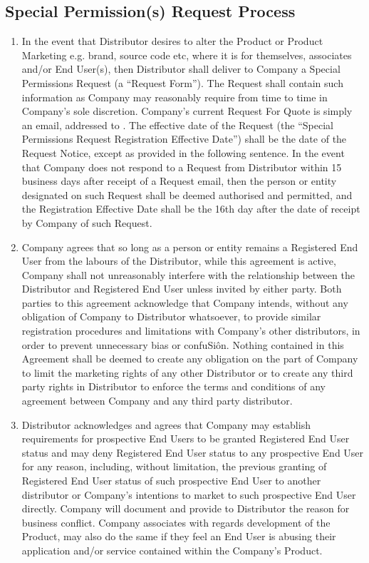 \documentclass[letterpaper,10pt,openany,oneside,english]{sphinxmanual}
\begin{document}
\subsection{Special Permission(s) Request Process}
\label{\detokenize{grantlicence:special-permission-s-request-process}}\begin{enumerate}
\item {} 
In the event that Distributor desires to alter the Product or Product Marketing e.g. brand, source code etc, where it is for themselves, associates and/or End User(s), then Distributor shall deliver to Company a Special Permissions Request (a “Request Form”). The Request shall contain such information as Company may reasonably require from time to time in Company’s sole discretion. Company’s current Request For Quote is simply an email, addressed to  .  The effective date of the Request  (the “Special Permissions Request Registration Effective Date”) shall be the date of the Request Notice, except as provided in the following sentence. In the event that Company does not respond to a Request from Distributor within 15 business days after receipt of a Request email, then the person or entity designated on such Request shall be deemed authorised and permitted, and the Registration Effective Date  shall be the 16th day after the date of receipt by Company of such Request.

\item {} 
Company agrees that so long as a person or entity remains a Registered End User from the  labours of the Distributor, while this agreement is active, Company shall not unreasonably interfere with the relationship between the Distributor and Registered End User unless invited by either party. Both parties to this agreement acknowledge that Company intends, without any obligation of Company to Distributor whatsoever, to provide similar registration procedures and limitations with Company’s other distributors, in order to prevent unnecessary bias or confuSiôn. Nothing contained in this Agreement shall be deemed to create any obligation on the part of Company to limit the marketing rights of any other Distributor or to create any third party rights in Distributor to enforce the terms and conditions of any agreement between Company and any third party distributor.

\item {} 
Distributor acknowledges and agrees that Company may establish requirements for prospective End Users to be granted Registered End User status and may deny Registered End User status to any prospective End User for any reason, including, without limitation, the previous granting of Registered End User status of such prospective End User to another distributor or Company’s intentions to market to such prospective End User directly. Company will document and provide to Distributor the reason for business conflict. Company associates with regards development of the Product, may also do the same if they feel an End User is abusing their application and/or service contained within the Company’s Product.

\end{enumerate}
\end{document}
